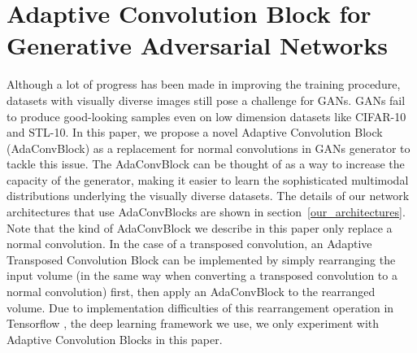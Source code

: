 \documentclass{article} %
\begin{document}
\section{Adaptive Convolution Block for Generative Adversarial Networks}
\label{gan_adaconvblock}
Although a lot of progress has been made in improving the training procedure, datasets with visually diverse images still pose a challenge for GANs. GANs fail to produce good-looking samples even on low dimension datasets like CIFAR-10 and STL-10. In this paper, we propose a novel Adaptive Convolution Block (AdaConvBlock) as a replacement for normal convolutions in GANs generator to tackle this issue. The AdaConvBlock can be thought of as a way to increase the capacity of the generator, making it easier to learn the sophisticated multimodal distributions underlying the visually diverse datasets. The details of our network architectures that use AdaConvBlocks are shown in section~\ref{our_architectures}. Note that the kind of AdaConvBlock we describe in this paper only replace a normal convolution. In the case of a transposed convolution, an Adaptive Transposed Convolution Block can be implemented by simply rearranging the input volume (in the same way when converting a transposed convolution to a normal convolution) first, then apply an AdaConvBlock to the rearranged volume. Due to implementation difficulties of this rearrangement operation in Tensorflow \citep{abadi2016tensorflow}, the deep learning framework we use, we only experiment with Adaptive Convolution Blocks in this paper. \par
\end{document}
